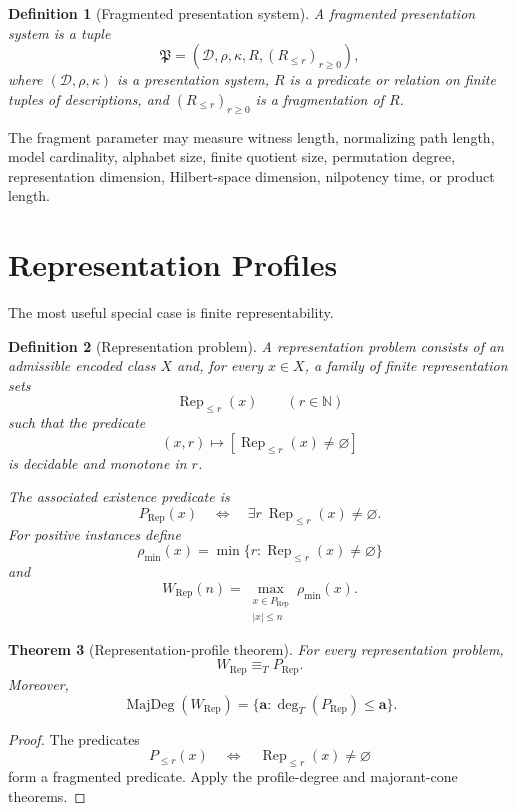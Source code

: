 \documentclass[11pt]{article}
\newtheorem{theorem}{Theorem}[section]
\newtheorem{definition}[theorem]{Definition}
\begin{document}
\begin{definition}[Fragmented presentation system]
A fragmented presentation system is a tuple
\[
\mathfrak P=(\mathcal D,\rho,\kappa,R,(R_{\le r})_{r\ge0}),
\]
where \((\mathcal D,\rho,\kappa)\) is a presentation system, \(R\) is a predicate or relation on finite tuples of descriptions, and \((R_{\le r})_{r\ge0}\) is a fragmentation of \(R\).
\end{definition}

The fragment parameter may measure witness length, normalizing path length, model cardinality, alphabet size, finite quotient size, permutation degree, representation dimension, Hilbert-space dimension, nilpotency time, or product length.

\section{Representation Profiles}

The most useful special case is finite representability.

\begin{definition}[Representation problem]
A representation problem consists of an admissible encoded class \(X\) and, for every \(x\in X\), a family of finite representation sets
\[
\operatorname{Rep}_{\le r}(x)
\qquad
(r\in\mathbb N)
\]
such that the predicate
\[
(x,r)\longmapsto
[\operatorname{Rep}_{\le r}(x)\ne\varnothing]
\]
is decidable and monotone in \(r\).

The associated existence predicate is
\[
P_{\operatorname{Rep}}(x)
\quad\Longleftrightarrow\quad
\exists r\ \operatorname{Rep}_{\le r}(x)\ne\varnothing.
\]
For positive instances define
\[
\rho_{\min}(x)=
\min\{r:\operatorname{Rep}_{\le r}(x)\ne\varnothing\}
\]
and
\[
W_{\operatorname{Rep}}(n)
=
\max_{\substack{x\in P_{\operatorname{Rep}}\\ |x|\le n}}
\rho_{\min}(x).
\]
\end{definition}

\begin{theorem}[Representation-profile theorem]
For every representation problem,
\[
W_{\operatorname{Rep}}\equiv_T P_{\operatorname{Rep}}.
\]
Moreover,
\[
\operatorname{MajDeg}(W_{\operatorname{Rep}})
=
\{\mathbf a:\deg_T(P_{\operatorname{Rep}})\le \mathbf a\}.
\]
\end{theorem}

\begin{proof}
The predicates
\[
P_{\le r}(x)
\quad\Longleftrightarrow\quad
\operatorname{Rep}_{\le r}(x)\ne\varnothing
\]
form a fragmented predicate. Apply the profile-degree and majorant-cone theorems.
\end{proof}
\end{document}
